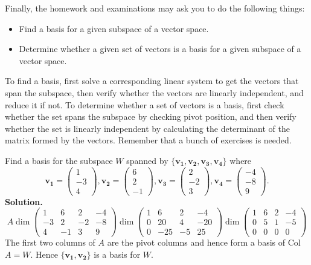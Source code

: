 \documentclass[10pt, a4paper]{article}
\newcommand{\vt}[1]{\mathbf{#1}}
\begin{document}
\indent Finally, the homework and examinations may ask you to do the following things:
\begin{itemize}
    \item Find a basis for a given subspace of a vector space.
    \item Determine whether a given set of vectors is a basis for a given subspace of a vector space.
\end{itemize}
To find a basis, first solve a corresponding linear system to get the vectors that span the subspace, then verify whether the vectors are linearly independent, and reduce it if not.
To determine whether a set of vectors is a basis, first check whether the set spans the subspace by checking pivot position, and then verify whether the set is linearly independent by calculating the determinant of the matrix formed by the vectors. Remember that a bunch of exercises is needed.
\begin{example}
    Find a basis for the subspace $W$ spanned by $\{\vt{v_1}, \vt{v_2}, \vt{v_3},\vt{v_4}\}$ where\[
    \vt{v_1} = \begin{pmatrix}
        1\\-3\\4
    \end{pmatrix},
    \vt{v_2} = \begin{pmatrix}
        6\\2\\-1
    \end{pmatrix},
    \vt{v_3} = \begin{pmatrix}
        2\\-2\\3
    \end{pmatrix},
    \vt{v_4} = \begin{pmatrix}
        -4\\-8\\9
    \end{pmatrix}.
    \]
    \textbf{Solution.}\\
    \[
    A\dim\begin{pmatrix}
        1 & 6 & 2 & -4\\
        -3 & 2 & -2 & -8\\
        4 & -1 & 3 & 9
    \end{pmatrix}\dim\begin{pmatrix}
        1 & 6 & 2 & -4\\
        0 & 20 & 4 & -20\\
        0 & -25 & -5 & 25
    \end{pmatrix}\dim\begin{pmatrix}
        1 & 6 & 2 & -4\\
        0 & 5 & 1 & -5\\
        0 & 0 & 0 & 0
    \end{pmatrix}
    \]
    The first two columns of $A$ are the pivot columns and hence form a basis of Col$A=W$. Hence $\{\vt{v_1}, \vt{v_2}\}$ is a basis for $W$.
\end{example}
\end{document}
